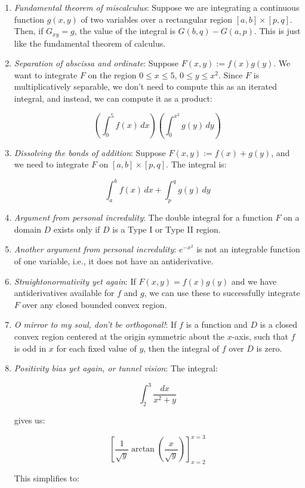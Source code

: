 \documentclass[10pt]{amsart}
\begin{document}
\begin{enumerate}
\item {\em Fundamental theorem of miscalculus}: Suppose we are
  integrating a continuous function $g(x,y)$ of two variables over a
  rectangular region $[a,b] \times [p,q]$. Then, if $G_{xy} = g$, the
  value of the integral is $G(b,q) - G(a,p)$. This is just like the
  fundamental theorem of calculus.
\item {\em Separation of abscissa and ordinate}: Suppose $F(x,y) :=
  f(x)g(y)$. We want to integrate $F$ on the region $0 \le x \le 5$,
  $0 \le y \le x^2$. Since $F$ is multiplicatively separable, we don't
  need to compute this as an iterated integral, and instead, we can
  compute it as a product:

  $$\left(\int_0^5 f(x) \, dx\right)\left(\int_0^{x^2} g(y) \, dy \right)$$
\item {\em Dissolving the bonds of addition}: Suppose $F(x,y) := f(x)
  + g(y)$, and we need to integrate $F$ on $[a,b] \times [p,q]$. The
  integral is:

  $$\int_a^b f(x) \, dx + \int_p^q g(y) \, dy$$
\item {\em Argument from personal incredulity}: The double integral for
  a function $F$ on a domain $D$ exists only if $D$ is a Type I or
  Type II region.
\item {\em Another argument from personal incredulity}: $e^{-x^2}$ is
  not an integrable function of one variable, i.e., it does not have
  an antiderivative.
\item {\em Straightonormativity yet again}: If $F(x,y) = f(x)g(y)$ and
  we have antiderivatives available for $f$ and $g$, we can use these
  to successfully integrate $F$ over any closed bounded convex region.

\item {\em O mirror to my soul, don't be orthogonal!}: If $f$ is a
  function and $D$ is a closed convex region centered at the origin
  symmetric about the $x$-axis, such that $f$ is odd in $x$ for each
  fixed value of $y$, then the integral of $f$ over $D$ is zero.

\item {\em Positivity bias yet again, or tunnel vision}: The integral:

  $$\int_2^3 \frac{dx}{x^2 + y}$$

  gives us:

  $$\left[\frac{1}{\sqrt{y}} \arctan\left(\frac{x}{\sqrt{y}}\right)\right]_{x = 2}^{x =3}$$

  This simplifies to:


\end{enumerate}
\end{document}

